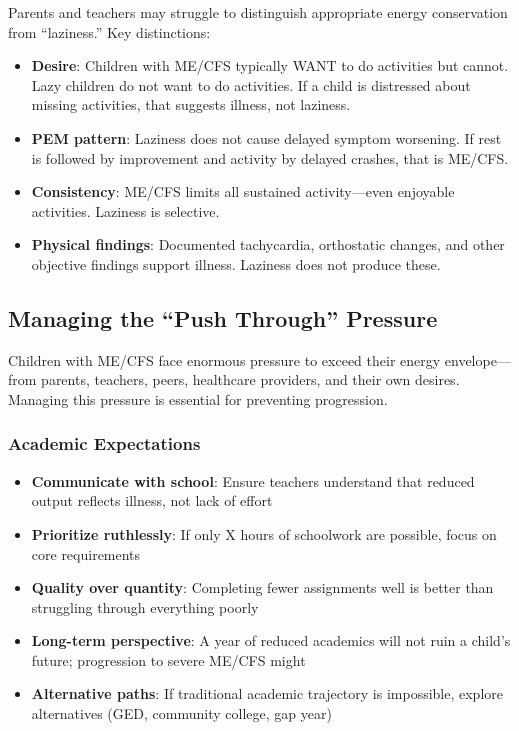 Parents and teachers may struggle to distinguish appropriate energy conservation from ``laziness.'' Key distinctions:

\begin{itemize}
    \item \textbf{Desire}: Children with ME/CFS typically WANT to do activities but cannot. Lazy children do not want to do activities. If a child is distressed about missing activities, that suggests illness, not laziness.

    \item \textbf{PEM pattern}: Laziness does not cause delayed symptom worsening. If rest is followed by improvement and activity by delayed crashes, that is ME/CFS.

    \item \textbf{Consistency}: ME/CFS limits all sustained activity---even enjoyable activities. Laziness is selective.

    \item \textbf{Physical findings}: Documented tachycardia, orthostatic changes, and other objective findings support illness. Laziness does not produce these.
\end{itemize}

\subsection{Managing the ``Push Through'' Pressure}
\label{subsec:push-through-pressure}

Children with ME/CFS face enormous pressure to exceed their energy envelope---from parents, teachers, peers, healthcare providers, and their own desires. Managing this pressure is essential for preventing progression.

\subsubsection{Academic Expectations}

\begin{itemize}
    \item \textbf{Communicate with school}: Ensure teachers understand that reduced output reflects illness, not lack of effort
    \item \textbf{Prioritize ruthlessly}: If only X hours of schoolwork are possible, focus on core requirements
    \item \textbf{Quality over quantity}: Completing fewer assignments well is better than struggling through everything poorly
    \item \textbf{Long-term perspective}: A year of reduced academics will not ruin a child's future; progression to severe ME/CFS might
    \item \textbf{Alternative paths}: If traditional academic trajectory is impossible, explore alternatives (GED, community college, gap year)
\end{itemize}

